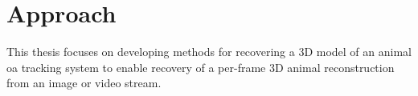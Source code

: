 

\section{Approach} %

This thesis focuses on developing methods for recovering a 3D model of an animal oa tracking system to enable recovery of a per-frame 3D animal reconstruction from an image or video stream. 


